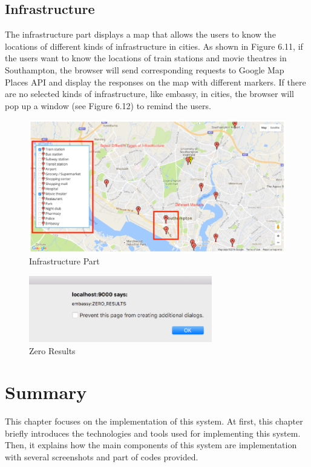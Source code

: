 \subsection{Infrastructure}

The infrastructure part displays a map that allows the users to know the locations of different kinds of infrastructure in cities. As shown in Figure 6.11, if the users want to know the locations of train stations and movie theatres in Southampton, the browser will send corresponding requests to Google Map Places API and display the responses on the map with different markers. If there are no selected kinds of infrastructure, like embassy, in cities, the browser will pop up a window (see Figure 6.12) to remind the users.


\begin{figure}[H]
  \centering
  \includegraphics[width=15cm]{./img/Picture27}
  \caption{Infrastructure Part}
  \label{Figure:figex}
\end{figure}

\begin{figure}[H]
  \centering
  \includegraphics[width=8cm]{./img/Picture28}
  \caption{Zero Results}
  \label{Figure:figex}
\end{figure}



\section{Summary}


This chapter focuses on the implementation of this system. At first, this chapter briefly introduces the technologies and tools used for implementing this system. Then, it explains how the main components of this system are implementation with several screenshots and part of codes provided.

